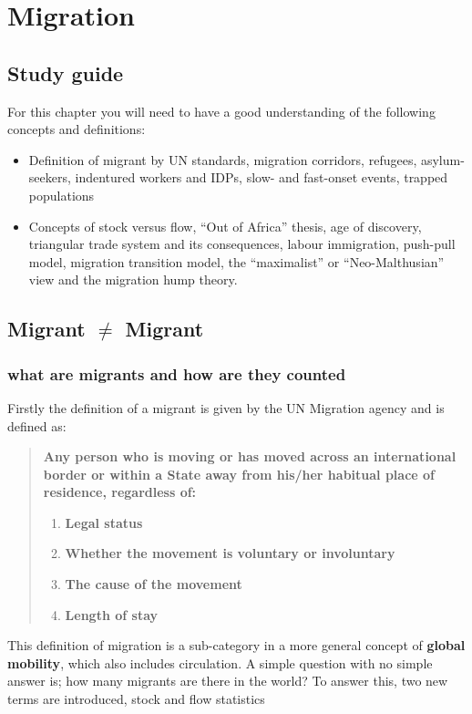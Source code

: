 \documentclass[../summary.tex]{subfiles}
\begin{document}
	
	\section{Migration}
	
	\subsection{Study guide}
	For this chapter you will need to have a good understanding of the following concepts and definitions:
	\begin{itemize}
		\item Definition of migrant by UN standards, migration corridors, refugees, asylum-seekers, indentured workers and IDPs, slow- and fast-onset events, trapped populations
		\item Concepts of stock versus flow, ``Out of Africa'' thesis, age of discovery, triangular trade system and its consequences, labour immigration, push-pull model, migration transition model, the ``maximalist'' or ``Neo-Malthusian'' view and the migration hump theory.
	\end{itemize}
	
	\subsection{Migrant $\neq$ Migrant}
	\subsubsection{what are migrants and how are they counted}
	Firstly the definition of a migrant is given by the UN Migration agency and is defined as:
	\begin{quote}
		\textbf{Any person who is moving or has moved across an international border or within a State away from his/her habitual place of residence, regardless of:}
		\begin{enumerate}
			\item \textbf{Legal status}
			\item \textbf{Whether the movement is voluntary or involuntary}
			\item \textbf{The cause of the movement}
			\item \textbf{Length of stay}
		\end{enumerate}
	\end{quote}
	This definition of migration is a sub-category in a more general concept of \textbf{global mobility}, which also includes circulation. A simple question with no simple answer is; how many migrants are there in the world? To answer this, two new terms are introduced, stock and flow statistics
	
\end{document}
